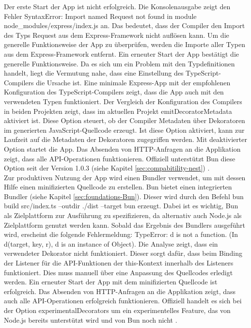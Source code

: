 \noindent
Der erste Start der App ist nicht erfolgreich. Die Konsolenausgabe zeigt den Fehler \glq SyntaxError: Import named Request not found in module node\_modules/express/index.js\grq{} an. Das bedeutet, dass der Compiler den Import des Typs \glq Request\grq{} aus dem Express-Framework nicht auflösen kann. Um die generelle Funktionsweise der App zu überprüfen, werden die Importe aller Typen aus dem Express-Framework entfernt. Ein erneuter Start der App bestätigt die generelle Funktionsweise. Da es sich um ein Problem mit den Typdefinitionen handelt, liegt die Vermutung nahe, dass eine Einstellung des TypeScript-Compilers die Ursache ist. Eine minimale Express-App mit der empfohlenen Konfiguration des TypeScript-Compilers zeigt, dass die App auch mit den verwendeten Typen funktioniert. Der Vergleich der Konfiguration des Compilers in beiden Projekten zeigt, dass im aktuellen Projekt \glq emitDecoratorMetadata\grq{} aktiviert ist. Diese Option steuert, ob der Compiler Metadaten über Dekoratoren im generierten JavaScript-Quellcode erzeugt. Ist diese Option aktiviert, kann zur Laufzeit auf die Metadaten der Dekoratoren zugegriffen werden. Mit deaktivierter Option startet die App. Das Absenden von HTTP-Anfragen an die Applikation zeigt, dass alle API-Operationen funktionieren. Offiziell unterstützt Bun diese Option seit der Version 1.0.3 (siehe Kapitel \ref{sec:compabitility-nest}) \cite{McDonnel.2023}.\\

\noindent
Zur produktiven Nutzung der App wird einen Bundler verwendet, um mit dessen Hilfe einen minifizierten Quellcode zu erstellen. Bun bietet einen integrierten Bundler (siehe Kapitel \ref{sec:foundations-Bun}). Dieser wird durch den Befehl \glq bun build src/index.ts --outdir ./dist --target bun\grq{} erzeugt. Dabei ist es wichtig, Bun als Zielplattform zur Ausführung zu spezifizieren, da alternativ auch Node.js als Zielplattform genutzt werden kann. Sobald das Ergebnis des Bundlers ausgeführt wird, erscheint die folgende Fehlermeldung: \glq TypeError: d is not a function. (In d(target, key, r), d is an instance of Object)\grq{}. Die Analyse zeigt, dass ein verwendeter Dekorator nicht funktioniert. Dieser sorgt dafür, dass beim Binding der Listener für die API-Funktionen der this-Kontext innerhalb des Listeners funktioniert. Dies muss manuell über eine Anpassung des Quellcodes erledigt werden. Ein erneuter Start der App mit dem minifizierten Quellcode ist erfolgreich. Das Absenden von HTTP-Anfragen an die Applikation zeigt, dass auch alle API-Operationen erfolgreich funktionieren. Offiziell handelt es sich bei der Option \glq experimentalDecorators\grq{} um ein experimentelles Feature, das von Node.js bereits unterstützt wird und von Bun noch nicht \cite{Microsoft.2023}.

